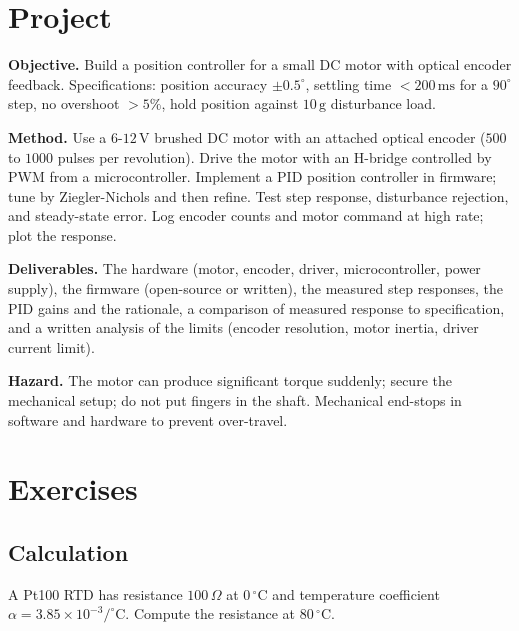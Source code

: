 \section{Project}

\begin{project}
\textbf{Objective.} Build a position controller for a small DC motor with optical encoder feedback. Specifications: position accuracy $\pm 0.5^\circ$, settling time $< 200\,\text{ms}$ for a $90^\circ$ step, no overshoot $> 5\%$, hold position against $10\,\text{g}$ disturbance load.

\textbf{Method.} Use a $6$-$12\,\text{V}$ brushed DC motor with an attached optical encoder ($500$ to $1000$ pulses per revolution). Drive the motor with an H-bridge controlled by PWM from a microcontroller. Implement a PID position controller in firmware; tune by Ziegler-Nichols and then refine. Test step response, disturbance rejection, and steady-state error. Log encoder counts and motor command at high rate; plot the response.

\textbf{Deliverables.} The hardware (motor, encoder, driver, microcontroller, power supply), the firmware (open-source or written), the measured step responses, the PID gains and the rationale, a comparison of measured response to specification, and a written analysis of the limits (encoder resolution, motor inertia, driver current limit).

\textbf{Hazard.} The motor can produce significant torque suddenly; secure the mechanical setup; do not put fingers in the shaft. Mechanical end-stops in software and hardware to prevent over-travel.
\end{project}

\section{Exercises}

\subsection*{Calculation}

\begin{exercise}
A Pt100 RTD has resistance $100\,\Omega$ at $0\,^\circ\text{C}$ and temperature coefficient $\alpha = 3.85 \times 10^{-3}/^\circ\text{C}$. Compute the resistance at $80\,^\circ\text{C}$.
\end{exercise}

